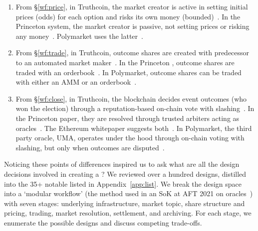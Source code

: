 \begin{enumerate}
\item From \S\ref{wf:price}, in Truthcoin, the market creator is active in setting initial prices (\ie odds) for each option and risks its own money (bounded)~\cite{Sz14}. In the Princeton system, the market creator is passive, not setting prices or risking any money~\cite{BCFKMN14}. Polymarket uses the latter~\cite{poly}. 

\item From \S\ref{wf:trade}, in Truthcoin, outcome shares are created with predecessor to an automated market maker~\cite{Sz14}. In the Princeton \depm, outcome shares are traded with an orderbook~\cite{BCFKMN14}. In Polymarket, outcome shares can be traded with either an AMM or an orderbook~\cite{poly}. 

\item From \S\ref{wf:close}, in Truthcoin, the blockchain decides event outcomes (\eg who won the election) through a reputation-based on-chain vote with slashing~\cite{Sz14}. In the Princeton paper, they are resolved through trusted arbiters acting as oracles~\cite{BCFKMN14}. The Ethereum whitepaper suggests both~\cite{But13}. In Polymarket, the third party oracle, UMA, operates under the hood through on-chain voting with slashing, but only when outcomes are disputed~\cite{poly,uma}.
\end{enumerate}

Noticing these points of differences inspired us to ask what are all the design decisions involved in creating a \depm?  We reviewed over a hundred designs, distilled into the 35+ notable \depms listed in Appendix~\ref{app:list}. We break the \depm design space into a `modular workflow' (the method used in an SoK at AFT 2021 on oracles~\cite{ClEsGS21}) with seven stages: underlying infrastructure, market topic, share structure and pricing, trading, market resolution, settlement, and archiving. For each stage, we enumerate the possible designs and discuss competing trade-offs. 


